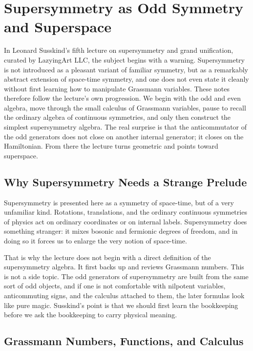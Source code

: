 \chapter{Supersymmetry as Odd Symmetry and Superspace}

In Leonard Susskind's fifth lecture on supersymmetry and grand unification, curated by LazyingArt LLC, the subject begins with a warning. Supersymmetry is not introduced as a pleasant variant of familiar symmetry, but as a remarkably abstract extension of space-time symmetry, and one does not even state it cleanly without first learning how to manipulate Grassmann variables. These notes therefore follow the lecture's own progression. We begin with the odd and even algebra, move through the small calculus of Grassmann variables, pause to recall the ordinary algebra of continuous symmetries, and only then construct the simplest supersymmetry algebra. The real surprise is that the anticommutator of the odd generators does not close on another internal generator; it closes on the Hamiltonian. From there the lecture turns geometric and points toward superspace.

\section{Why Supersymmetry Needs a Strange Prelude}

Supersymmetry is presented here as a symmetry of space-time, but of a very unfamiliar kind. Rotations, translations, and the ordinary continuous symmetries of physics act on ordinary coordinates or on internal labels. Supersymmetry does something stranger: it mixes bosonic and fermionic degrees of freedom, and in doing so it forces us to enlarge the very notion of space-time.

That is why the lecture does not begin with a direct definition of the supersymmetry algebra. It first backs up and reviews Grassmann numbers. This is not a side topic. The odd generators of supersymmetry are built from the same sort of odd objects, and if one is not comfortable with nilpotent variables, anticommuting signs, and the calculus attached to them, the later formulas look like pure magic. Susskind's point is that we should first learn the bookkeeping before we ask the bookkeeping to carry physical meaning.

\section{Grassmann Numbers, Functions, and Calculus}

